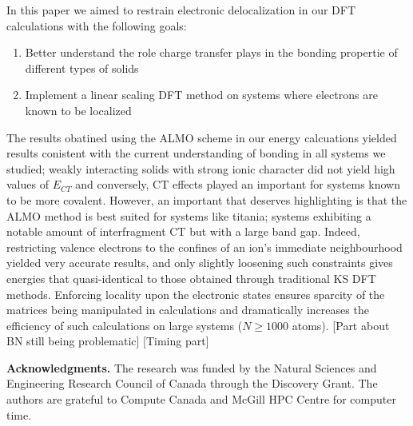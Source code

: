 \documentclass[aps,prb,twocolumn,amsmath,amssymb,superscriptaddress,longbibliography]{revtex4-1}
\begin{document}
In this paper we aimed to restrain electronic delocalization in our DFT calculations with the following goals:
\begin{enumerate}
\item{Better understand the role charge transfer plays in the bonding propertie of different types of solids}
\item{Implement a linear scaling DFT method on systems where electrons are known to be localized}
\end{enumerate}
The results obatined using the ALMO scheme in our energy calcuations yielded results conistent with the current understanding of bonding in all systems we studied; weakly interacting solids with strong ionic character did not yield high values of $E_{CT}$ and conversely, CT effects played an important for systems known to be more covalent.
However, an important that deserves highlighting is that the ALMO method is best suited for systems like titania; systems exhibiting a notable amount of interfragment CT but with a large band gap. 
Indeed, restricting valence electrons to the confines of an ion's immediate neighbourhood yielded very accurate results, and only slightly loosening such constraints gives energies that quasi-identical to those obtained through traditional KS DFT methods. 
Enforcing locality upon the electronic states ensures sparcity of the matrices being manipulated in calculations and dramatically increases the efficiency of such calculations on large systems ($N\geq 1000$ atoms).
[Part about BN still being problematic]
[Timing part]



\textbf{Acknowledgments.} The research was funded by the Natural Sciences and Engineering Research Council of Canada through the Discovery Grant. The authors are grateful to Compute Canada and McGill HPC Centre for computer time.


%
%
\end{document}
